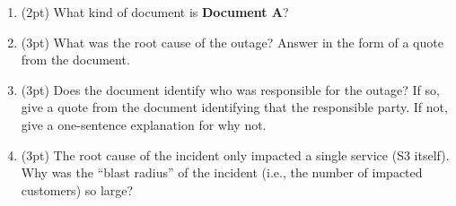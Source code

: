 \documentclass{report}
\newif\ifkey
\newcommand{\answershort}[1]{\ifkey\color{red}\underline{\textbf{#1}}\color{black}\else\underline{\hspace{3in}}\fi\xspace}
\newcommand{\answerlong}[1]{\ifkey\color{red}\textbf{#1}\color{black}\else\vspace{0.5in}\fi\xspace}
\newcommand*{\pts}[1]{\addtocounter{points}{#1}(#1pt)}
\begin{document}
\begin{spacing}{1.4}
\begin{enumerate}[leftmargin=*]
    \begin{enumerate}
    \item \pts{2} Identify one of the above Joel Test items \textbf{A}-\textbf{E} that your group project did better than the other items. Explain why you
      were better at this item than the others and how it benefited your project.\\
      \answerlong{Answers vary.}

    \item \pts{2} Identify one of the above Joel Test items \textbf{A}-\textbf{E} that your group project did worse than the other items. Explain, via
      specific examples, how failing to meet this Joel Test requirement impacted your project.\\
      \answerlong{Answers vary.}
      \end{enumerate}
    
    \newpage
    \textbf{IV. Document-based Questions.} All questions in this section refer to a documents \textbf{A-B}.
    These documents appear at the end of the exam (I recommend that you tear them out and refer to them as you answer the questions).

    Questions on this page concern \textbf{Document A}.
    
    \item \pts{2} What kind of document is \textbf{Document A}? \\ \answershort{postmortem}

    \item \pts{3} What was the root cause of the outage? Answer in the form of a quote
      from the document.\\ \answerlong{``one of the inputs to the command was entered incorrectly''}

    \item \pts{3} Does the document identify who was responsible for the outage? If so, give a quote
      from the document identifying that the responsible party. If not, give a one-sentence explanation
      for why not.\\
      \answerlong{The document does not identify who was responsible, because this is a blameless postmortem:
        it blames the system, rather than the individual. (Any answer with ``blameless'' or a synonym will probably be accepted.)}

    \item \pts{3} The root cause of the incident only impacted a single service (S3 itself). Why was the ``blast radius''
      of the incident (i.e., the number of impacted customers) so large?\\
      \answerlong{Other services relied on S3, so a cascading failure caused them to fail, as well.}
      

\end{enumerate}
\end{spacing}
\end{document}
